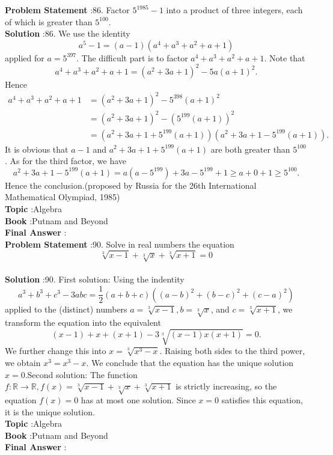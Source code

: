 \documentclass[10pt]{article}
\begin{document}
\textbf{Problem Statement} :86. Factor $5^{1985}-1$ into a product of three integers, each of which is greater than $5^{100}$.\\
\textbf{Solution} :86. We use the identity$$ a^{5}-1=(a-1)\left(a^{4}+a^{3}+a^{2}+a+1\right) $$applied for $a=5^{397}$. The difficult part is to factor $a^{4}+a^{3}+a^{2}+a+1$. Note that$$ a^{4}+a^{3}+a^{2}+a+1=\left(a^{2}+3 a+1\right)^{2}-5 a(a+1)^{2} . $$Hence$$ \begin{aligned} a^{4}+a^{3}+a^{2}+a+1 &=\left(a^{2}+3 a+1\right)^{2}-5^{398}(a+1)^{2} \\ &=\left(a^{2}+3 a+1\right)^{2}-\left(5^{199}(a+1)\right)^{2} \\ &=\left(a^{2}+3 a+1+5^{199}(a+1)\right)\left(a^{2}+3 a+1-5^{199}(a+1)\right) . \end{aligned} $$It is obvious that $a-1$ and $a^{2}+3 a+1+5^{199}(a+1)$ are both greater than $5^{100}$. As for the third factor, we have$$ a^{2}+3 a+1-5^{199}(a+1)=a\left(a-5^{199}\right)+3 a-5^{199}+1 \geq a+0+1 \geq 5^{100} . $$Hence the conclusion.(proposed by Russia for the 26th International Mathematical Olympiad, 1985)\\
\textbf{Topic} :Algebra\\
\textbf{Book} :Putnam and Beyond\\
\textbf{Final Answer} :\\


\textbf{Problem Statement} :90. Solve in real numbers the equation$$ \sqrt[3]{x-1}+\sqrt[3]{x}+\sqrt[3]{x+1}=0 $$\\
\textbf{Solution} :90. First solution: Using the indentity$$ a^{3}+b^{3}+c^{3}-3 a b c=\frac{1}{2}(a+b+c)\left((a-b)^{2}+(b-c)^{2}+(c-a)^{2}\right) $$applied to the (distinct) numbers $a=\sqrt[3]{x-1}, b=\sqrt[3]{x}$, and $c=\sqrt[3]{x+1}$, we transform the equation into the equivalent$$ (x-1)+x+(x+1)-3 \sqrt[3]{(x-1) x(x+1)}=0 . $$We further change this into $x=\sqrt[3]{x^{3}-x}$. Raising both sides to the third power, we obtain $x^{3}=x^{3}-x$. We conclude that the equation has the unique solution $x=0$.Second solution: The function $f: \mathbb{R} \rightarrow \mathbb{R}, f(x)=\sqrt[3]{x-1}+\sqrt[3]{x}+\sqrt[3]{x+1}$ is strictly increasing, so the equation $f(x)=0$ has at most one solution. Since $x=0$ satisfies this equation, it is the unique solution.\\
\textbf{Topic} :Algebra\\
\textbf{Book} :Putnam and Beyond\\
\textbf{Final Answer} :\\
\end{document}
